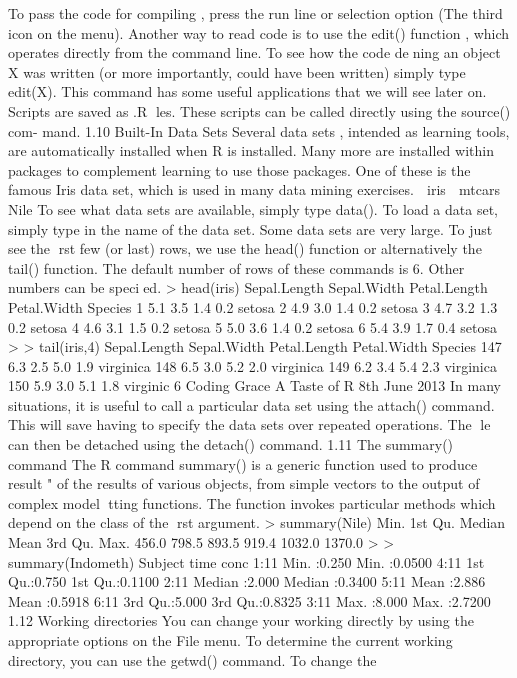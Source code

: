 To pass the code for compiling , press the run line or selection option (The third icon
on the menu).
Another way to read code is to use the edit() function , which operates directly from the
command line. To see how the code dening an object X was written (or more importantly,
could have been written) simply type edit(X). This command has some useful applications
that we will see later on.
Scripts are saved as .R les. These scripts can be called directly using the source() com-
mand.
1.10 Built-In Data Sets
Several data sets , intended as learning tools, are automatically installed when R is installed.
Many more are installed within packages to complement learning to use those packages. One
of these is the famous Iris data set, which is used in many data mining exercises.
 iris
 mtcars
 Nile
To see what data sets are available, simply type data(). To load a data set, simply type in the
name of the data set. Some data sets are very large. To just see the rst few (or last) rows, we
use the head() function or alternatively the tail() function. The default number of rows of
these commands is 6. Other numbers can be specied.
> head(iris)
Sepal.Length Sepal.Width Petal.Length Petal.Width Species
1 5.1 3.5 1.4 0.2 setosa
2 4.9 3.0 1.4 0.2 setosa
3 4.7 3.2 1.3 0.2 setosa
4 4.6 3.1 1.5 0.2 setosa
5 5.0 3.6 1.4 0.2 setosa
6 5.4 3.9 1.7 0.4 setosa
>
> tail(iris,4)
Sepal.Length Sepal.Width Petal.Length Petal.Width Species
147 6.3 2.5 5.0 1.9 virginica
148 6.5 3.0 5.2 2.0 virginica
149 6.2 3.4 5.4 2.3 virginica
150 5.9 3.0 5.1 1.8 virginic
6
Coding Grace A Taste of R 8th June 2013
In many situations, it is useful to call a particular data set using the attach() command. This
will save having to specify the data sets over repeated operations. The le can then be detached
using the detach() command.
1.11 The summary() command
The R command summary() is a generic function used to produce result \summaries" of the
results of various objects, from simple vectors to the output of complex model tting functions.
The function invokes particular methods which depend on the class of the rst argument.
> summary(Nile)
Min. 1st Qu. Median Mean 3rd Qu. Max.
456.0 798.5 893.5 919.4 1032.0 1370.0
>
> summary(Indometh)
Subject time conc
1:11 Min. :0.250 Min. :0.0500
4:11 1st Qu.:0.750 1st Qu.:0.1100
2:11 Median :2.000 Median :0.3400
5:11 Mean :2.886 Mean :0.5918
6:11 3rd Qu.:5.000 3rd Qu.:0.8325
3:11 Max. :8.000 Max. :2.7200
1.12 Working directories
You can change your working directly by using the appropriate options on the File menu. To
determine the current working directory, you can use the getwd() command. To change the
